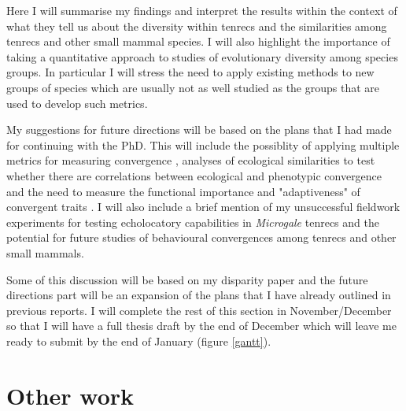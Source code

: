 \documentclass[12pt,a4paper]{article}
\begin{document}
	Here I will summarise my findings and interpret the results within the context of what they tell us about the diversity within tenrecs and the similarities among tenrecs and other small mammal species. I will also highlight the importance of taking a quantitative approach to studies of evolutionary diversity among species groups. In particular I will stress the need to apply existing methods to new groups of species which are usually not as well studied as the groups that are used to develop such metrics. %
	
	My suggestions for future directions will be based on the plans that I had made for continuing with the PhD. This will include the possiblity of applying multiple metrics for measuring convergence \citep[e.g.][]{Ingram2013, Segar2013, Harmon2005}, analyses of ecological similarities to test whether there are correlations between ecological and phenotypic convergence \citep[e.g.][]{Moen2013} and the need to measure the functional importance and "adaptiveness" of convergent traits \citep{Losos2010}. I will also include a brief mention of my unsuccessful fieldwork experiments for testing echolocatory capabilities in \textit{Microgale} tenrecs and the potential for future studies of behavioural convergences among tenrecs and other small mammals.


	
	Some of this discussion will be based on my disparity paper and the future directions part will be an expansion of the plans that I have already outlined in previous reports. I will complete the rest of this section in November/December so that I will have a full thesis draft by the end of December which will leave me ready to submit by the end of January (figure \ref{gantt}).




\section{Other work}
	
\end{document}
